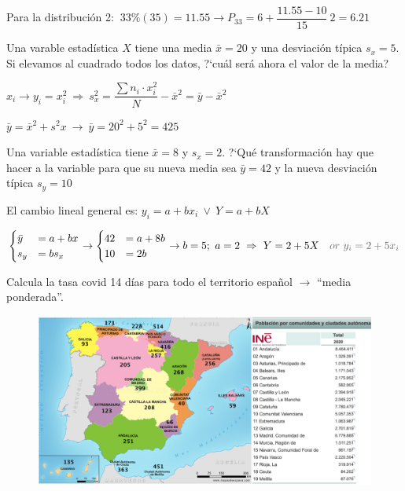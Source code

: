 Para la distribución 2: $\ 33\%(35)=11.55 \to P_{33}=6+\dfrac{11.55-10}{15}\ 2=6.21$

\vspace{5mm}%
\begin{ejemplo}
\begin{ejer}
	Una varable estadística $X$ tiene una media $\bar x=20$ y una desviación típica $s_x=5$. Si elevamos al cuadrado todos los datos, ?`cuál será ahora el valor de la media?
\end{ejer}	
\end{ejemplo}

$x_i \to y_i=x_i^2 \ \Rightarrow \  s_x^2=\dfrac{\displaystyle \sum n_i\cdot x_i^2}{N}- {\bar x}^2=\bar y-{\bar x}^2$

$\bar y={\bar x}^2+s^2x \ \to \ \bar y=20^2+5^2=425$


\vspace{5mm}%
\begin{ejemplo}
\begin{ejer}
	Una variable estadística tiene $\bar x=8$ y $s_x=2$. ?`Qué transformación hay que hacer a la variable para que su nueva media sea $\bar y=42$ y la nueva desviación típica $s_y=10$
\end{ejer}	
\end{ejemplo}

El cambio lineal general es: $y_i=a+bx_i \ \vee \ Y=a+bX$
 
$\begin{cases}
\bar y &= a + bx \\
s_y &= bs_x	
\end{cases}
\to 
\begin{cases}
42&=a+8b\\ 10&=2b	
\end{cases} \to b=5;\  a=2 \ \Rightarrow \ Y=2+5X \ \ \ \textcolor{gris}{or\ y_i=2+5x_i}$


\vspace{5mm} %
\begin{ejemplo}
\begin{ejer}
Calcula la tasa covid 14 días para todo el territorio español $\to$ \textsf{``media ponderada''}.
	

	\begin{figure}[H]
			\centering
			\includegraphics[width=1\textwidth]{imagenes/imagenes01/T01IM40.png}
	\end{figure}
\end{ejer}	
\end{ejemplo}

